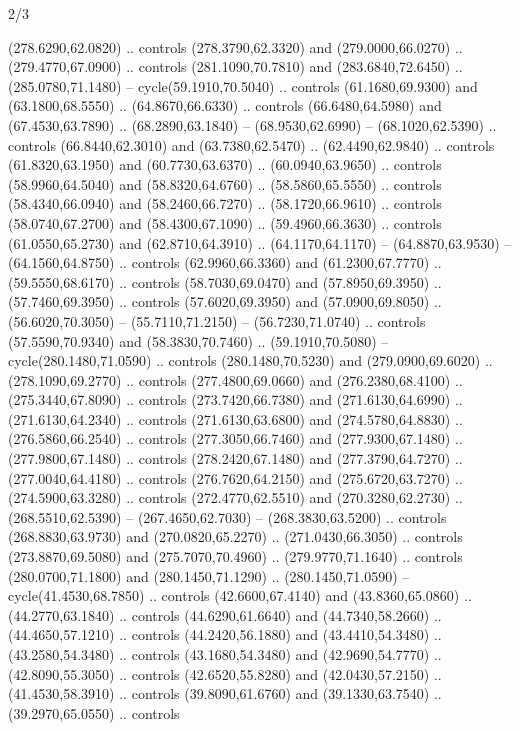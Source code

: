 \begin{flagdescription}{2/3}
\begin{scope}[xshift=0.5\flaglength,yshift=0.5\flagwidth,scale=\stretchfactor]
\begin{scope}[scale=0.001645\flagwidth,yshift=65mm,xshift=-63mm]
\begin{scope}[y=0.80pt, x=0.80pt, yscale=-1,]
\begin{scope}[cm={{1.33333,0.0,0.0,1.33333,(0.0,1e-05)}}]
  (278.6290,62.0820) .. controls (278.3790,62.3320) and (279.0000,66.0270) ..
  (279.4770,67.0900) .. controls (281.1090,70.7810) and (283.6840,72.6450) ..
  (285.0780,71.1480) -- cycle(59.1910,70.5040) .. controls (61.1680,69.9300) and
  (63.1800,68.5550) .. (64.8670,66.6330) .. controls (66.6480,64.5980) and
  (67.4530,63.7890) .. (68.2890,63.1840) -- (68.9530,62.6990) --
  (68.1020,62.5390) .. controls (66.8440,62.3010) and (63.7380,62.5470) ..
  (62.4490,62.9840) .. controls (61.8320,63.1950) and (60.7730,63.6370) ..
  (60.0940,63.9650) .. controls (58.9960,64.5040) and (58.8320,64.6760) ..
  (58.5860,65.5550) .. controls (58.4340,66.0940) and (58.2460,66.7270) ..
  (58.1720,66.9610) .. controls (58.0740,67.2700) and (58.4300,67.1090) ..
  (59.4960,66.3630) .. controls (61.0550,65.2730) and (62.8710,64.3910) ..
  (64.1170,64.1170) -- (64.8870,63.9530) -- (64.1560,64.8750) .. controls
  (62.9960,66.3360) and (61.2300,67.7770) .. (59.5550,68.6170) .. controls
  (58.7030,69.0470) and (57.8950,69.3950) .. (57.7460,69.3950) .. controls
  (57.6020,69.3950) and (57.0900,69.8050) .. (56.6020,70.3050) --
  (55.7110,71.2150) -- (56.7230,71.0740) .. controls (57.5590,70.9340) and
  (58.3830,70.7460) .. (59.1910,70.5080) -- cycle(280.1480,71.0590) .. controls
  (280.1480,70.5230) and (279.0900,69.6020) .. (278.1090,69.2770) .. controls
  (277.4800,69.0660) and (276.2380,68.4100) .. (275.3440,67.8090) .. controls
  (273.7420,66.7380) and (271.6130,64.6990) .. (271.6130,64.2340) .. controls
  (271.6130,63.6800) and (274.5780,64.8830) .. (276.5860,66.2540) .. controls
  (277.3050,66.7460) and (277.9300,67.1480) .. (277.9800,67.1480) .. controls
  (278.2420,67.1480) and (277.3790,64.7270) .. (277.0040,64.4180) .. controls
  (276.7620,64.2150) and (275.6720,63.7270) .. (274.5900,63.3280) .. controls
  (272.4770,62.5510) and (270.3280,62.2730) .. (268.5510,62.5390) --
  (267.4650,62.7030) -- (268.3830,63.5200) .. controls (268.8830,63.9730) and
  (270.0820,65.2270) .. (271.0430,66.3050) .. controls (273.8870,69.5080) and
  (275.7070,70.4960) .. (279.9770,71.1640) .. controls (280.0700,71.1800) and
  (280.1450,71.1290) .. (280.1450,71.0590) -- cycle(41.4530,68.7850) .. controls
  (42.6600,67.4140) and (43.8360,65.0860) .. (44.2770,63.1840) .. controls
  (44.6290,61.6640) and (44.7340,58.2660) .. (44.4650,57.1210) .. controls
  (44.2420,56.1880) and (43.4410,54.3480) .. (43.2580,54.3480) .. controls
  (43.1680,54.3480) and (42.9690,54.7770) .. (42.8090,55.3050) .. controls
  (42.6520,55.8280) and (42.0430,57.2150) .. (41.4530,58.3910) .. controls
  (39.8090,61.6760) and (39.1330,63.7540) .. (39.2970,65.0550) .. controls

\end{scope}
\end{scope}
\end{scope}
\end{scope}
\end{flagdescription}
